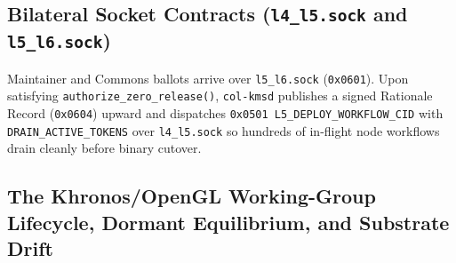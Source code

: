 \subsection{Bilateral Socket Contracts (\texttt{l4\_l5.sock} and \texttt{l5\_l6.sock})}

Maintainer and Commons ballots arrive over \texttt{l5\_l6.sock} (\texttt{0x0601}). Upon satisfying
\texttt{authorize\_zero\_release()}, \texttt{col-kmsd} publishes a signed Rationale Record
(\texttt{0x0604}) upward and dispatches \texttt{0x0501 L5\_DEPLOY\_WORKFLOW\_CID} with
\texttt{DRAIN\_ACTIVE\_TOKENS} over \texttt{l4\_l5.sock} so hundreds of in-flight node workflows
drain cleanly before binary cutover.

\subsection{The Khronos/OpenGL Working-Group Lifecycle, Dormant Equilibrium, and Substrate Drift}


